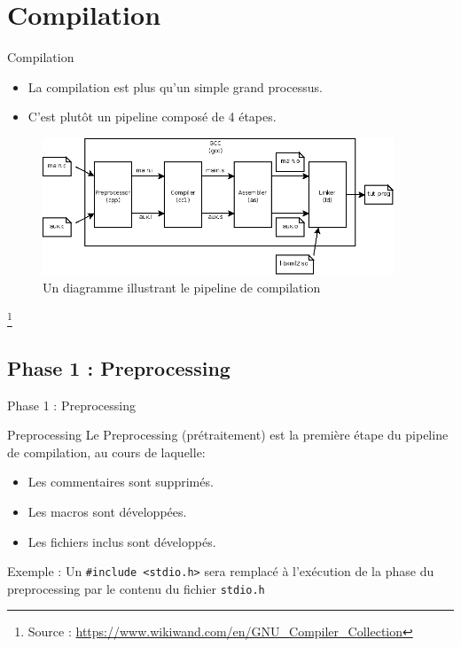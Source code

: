 \section{Compilation}
\begin{frame}{Compilation}
	\begin{itemize}
		\item La compilation est plus qu'un simple grand processus.
		\item C'est plutôt un \alert{pipeline } composé de 4 étapes.
	\end{itemize}
	\begin{figure}
		\centering
		\includegraphics[width=105mm]{resources/compilation_pipeline}
		\caption[Test]{Un diagramme illustrant le pipeline de compilation}
	\end{figure}
	\footnote[frame]{Source : \url{https://www.wikiwand.com/en/GNU_Compiler_Collection}}
\end{frame}

\subsection{Phase 1 : Preprocessing}
\begin{frame}{Phase 1 : Preprocessing}
	\begin{block}{Preprocessing}
		Le \alert{Preprocessing} (prétraitement) est la \alert{première} étape du pipeline de compilation, au cours de laquelle:
		\begin{itemize}
			\item Les commentaires sont supprimés.
			\item Les macros sont développées.
			\item Les fichiers inclus sont développés.
		\end{itemize}
	\end{block}
	\begin{exampleblock}{Exemple :}
		Un \texttt{\#include <stdio.h>} sera remplacé à l'exécution de la phase du preprocessing par le contenu du fichier \texttt{stdio.h}
	\end{exampleblock}
\end{frame}

